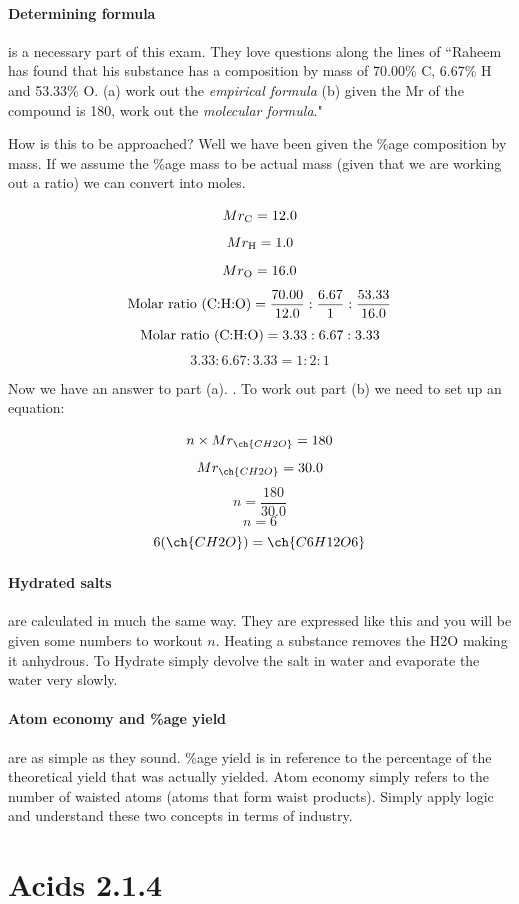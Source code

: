     \paragraph{Determining formula} is a necessary part of this exam.
    They love questions along the lines of ``Raheem has found that his substance has a composition by mass of 70.00\% C, 6.67\% H and 53.33\% O. (a) work out the \textit{empirical formula} (b) given the Mr of the compound is 180, work out the \textit{molecular formula}."
    
    How is this to be approached?
    Well we have been given the \%age composition by mass.
    If we assume the \%age mass to be actual mass (given that we are working out a ratio) we can convert into moles.
    
    \[Mr_\textnormal{C} = 12.0\]
    \[Mr_\textnormal{H} = 1.0\]
    \[Mr_\textnormal{O} = 16.0\]
    \[\textnormal{Molar ratio (C:H:O)} = \frac{70.00}{12.0} : \frac{6.67}{1} : \frac{53.33}{16.0}\]
    \[\textnormal{Molar ratio (C:H:O)} = 3.33 : 6.67 : 3.33\]
    \[3.33 : 6.67 : 3.33 = 1 : 2 : 1\]
    
    Now we have an answer to part (a). . To work out part (b) we need to set up an equation:
    
    \[n \times Mr_{\ch{CH2O}} = 180\]
    \[Mr_{\ch{CH2O}} = 30.0\]
    \[n = \frac{180}{30.0}\]
    \[n = 6\]
    \[6(\ch{CH2O}) = \ch{C6H12O6}\]
    
    \paragraph{Hydrated salts} are calculated in much the same way.
    They are expressed like this  and you will be given some numbers to workout $n$.
    Heating a substance removes the H2O making it anhydrous.
    To Hydrate simply devolve the salt in water and evaporate the water very slowly.
    
    \paragraph{Atom economy and \%age yield} are as simple as they sound.
    \%age yield is in reference to the percentage of the theoretical yield that was actually yielded.
    Atom economy simply refers to the number of waisted atoms (atoms that form waist products).
    Simply apply logic and understand these two concepts in terms of industry.
    
\section{Acids 2.1.4}

